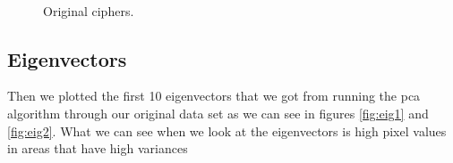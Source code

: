 \documentclass[paper=a4, fontsize=11pt]{scrartcl} %
\begin{document}
\begin{figure}[h]
{    }
     \\
    \caption{Original ciphers.}
    \label{fig:ciph}
\end{figure}
\clearpage

\subsection{Eigenvectors}
Then we plotted the first 10 eigenvectors that we got from running the pca algorithm through our original data set as we can see in figures \ref{fig:eig1} and \ref{fig:eig2}. What we can see when we look at the eigenvectors is high pixel values in areas that have high variances 
\end{document}
